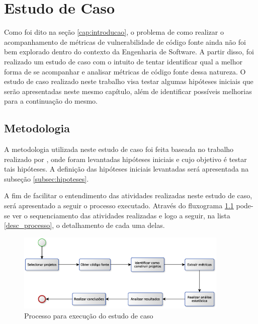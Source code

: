 \chapter{Estudo de Caso} \label{estudodecaso}

Como foi dito na seção \ref{cap:introducao}, o problema de como realizar o
acompanhamento de métricas de vulnerabilidade de código fonte ainda não foi bem
explorado dentro do contexto da Engenharia de Software. A partir disso,
foi realizado um estudo de caso com o intuito de tentar identificar qual a melhor forma
de se acompanhar e analisar métricas de código fonte dessa natureza. O estudo
de caso realizado neste trabalho visa testar algumas hipóteses iniciais que serão apresentadas
neste mesmo capítulo, além de identificar possíveis melhorias para a continuação
do mesmo.

\section{Metodologia} \label{sec:metodologia}

A metodologia utilizada neste estudo de caso foi feita baseada no trabalho
realizado por , onde foram levantadas
hipóteses iniciais e cujo objetivo é testar tais hipóteses. A definição das
hipóteses iniciais levantadas será apresentada na subseção \ref{subsec:hipoteses}.

A fim de facilitar o entendimento das atividades realizadas neste estudo de
caso, será apresentado a seguir o processo executado. Através do
fluxograma \ref{fig:processo_estudo_de_caso} pode-se ver o sequenciamento das
atividades realizadas e logo a seguir, na lista \ref{desc_processo}, o
detalhamento de cada uma delas.

\begin{figure}[h]
  \centering
  \includegraphics[width=0.9\textwidth]
      {figuras/estudo_de_caso_processo.eps}
  \caption{Processo para execução do estudo de caso}
  \label{fig:processo_estudo_de_caso}
\end{figure}

